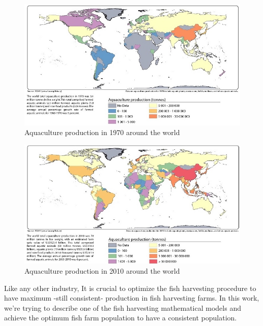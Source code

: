 \begin{figure}[H]
	\includegraphics[width=\textwidth]{1970.jpeg}
	\caption{Aquaculture production in 1970 around the world}
\end{figure}
\label{fig1.3} 

\begin{figure}[H]
	\includegraphics[width=\textwidth]{2010.jpeg}
	\caption{Aquaculture production in 2010 around the world}
\end{figure}
\label{fig1.4} 

Like any other industry, It is crucial to optimize the fish harvesting procedure to have maximum -still consistent- production in fish harvesting farms. In this work, we’re trying to describe one of the fish harvesting mathematical models and achieve the optimum fish farm population to have a consistent population.

